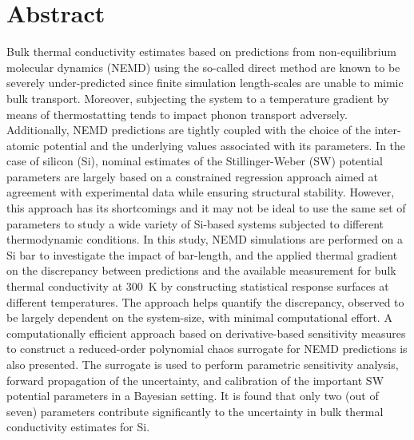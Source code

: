 \section*{Abstract}

Bulk thermal conductivity estimates based on predictions from non-equilibrium molecular dynamics (NEMD)
using the so-called direct method are known to be severely under-predicted since finite simulation
length-scales are unable to mimic bulk transport. Moreover, subjecting the system to a temperature gradient
by means of thermostatting tends to impact phonon transport adversely.  Additionally, NEMD predictions
are tightly coupled with the choice of the inter-atomic potential and the underlying values associated with its
parameters. In the case of silicon (Si), nominal estimates of the Stillinger-Weber (SW) potential parameters are largely based 
on a constrained regression approach aimed at agreement with experimental data while ensuring structural
stability. However, this approach has its shortcomings and it may not be ideal to use the same set of parameters
 to study a wide variety of Si-based
systems subjected to different thermodynamic conditions. 
In this study, NEMD simulations are performed on a Si bar to investigate the impact of bar-length,
and the applied thermal gradient on the discrepancy between predictions and the available measurement 
for bulk thermal conductivity at 300~K by constructing statistical response surfaces at different temperatures. 
The approach helps quantify the discrepancy, observed to be largely dependent on the system-size, with minimal
computational effort. A computationally efficient approach based on derivative-based sensitivity measures to
construct a reduced-order polynomial chaos surrogate for NEMD predictions is also presented. The surrogate
is used to perform parametric sensitivity analysis, forward propagation of the uncertainty, and calibration of the important SW potential parameters in a 
Bayesian setting. It is found that only two (out of seven) parameters contribute significantly to the uncertainty
in bulk thermal conductivity estimates for Si. 
